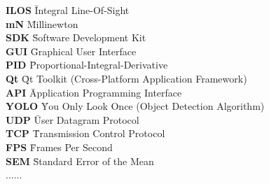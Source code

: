 



\begin{tabbing}


\textbf{ILOS} \hspace{2cm} \= Integral Line-Of-Sight \\[5pt]
\textbf{mN} \hspace{2cm} \= Millinewton \\[5pt]
\textbf{SDK} \hspace{2cm} \= Software Development Kit \\[5pt]
\textbf{GUI} \hspace{2cm} \= Graphical User Interface \\[5pt]
\textbf{PID} \hspace{2cm} \= Proportional-Integral-Derivative \\[5pt]
\textbf{Qt} \hspace{2cm} \= Qt Toolkit (Cross-Platform Application Framework) \\[5pt]
\textbf{API} \hspace{2cm} \= Application Programming Interface \\[5pt]
\textbf{YOLO} \hspace{2cm} \= You Only Look Once (Object Detection Algorithm) \\[5pt]
\textbf{UDP} \hspace{2cm} \= User Datagram Protocol \\[5pt]
\textbf{TCP} \hspace{2cm} \= Transmission Control Protocol \\[5pt]
\textbf{FPS} \hspace{2cm} \= Frames Per Second \\[5pt]
\textbf{SEM} \hspace{2cm} \= Standard Error of the Mean \\[5pt]
......
\end{tabbing}

